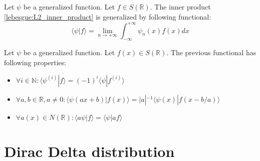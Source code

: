	\begin{notation}
		Let $\psi$ be a generalized function. Let $f\in S(\mathbb{R})$. The inner product \ref{lebesgue:L2_inner_product} is generalized by following functional:
        \begin{equation}
			\langle \psi|f \rangle = \lim_{n\rightarrow+\infty}\int_{-\infty}^{+\infty}\psi_n(x)f(x)dx
		\end{equation}
	\end{notation}
    
    \begin{property}
		Let $\psi$ be a generalized function. Let $f(x)\in S(\mathbb{R})$. The previous functional has following properties:
        \begin{itemize}
			\item \label{distribution:gf_prop1}$\forall i\in\mathbb{N}: \langle \psi^{(i)}|f \rangle = (-1)^i \langle \psi|f^{(i)} \rangle$
            \item $\forall a,b\in\mathbb{R}, a\neq0: \langle \psi(ax+b)|f(x) \rangle = |a|^{-1}\langle \psi(x)|f(x - b/a) \rangle$
            \item $\forall a(x)\in N(\mathbb{R}):\langle a\psi|f \rangle = \langle \psi|af \rangle$
		\end{itemize}
	\end{property}
    

\section{Dirac Delta distribution}

